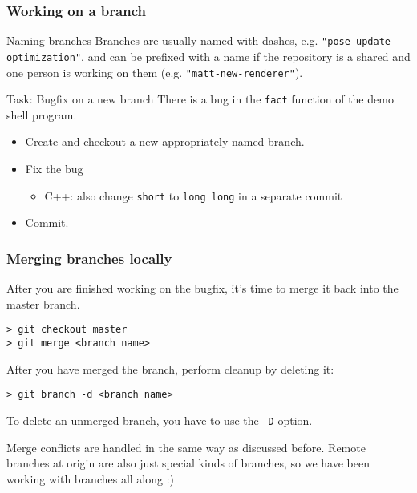 \begin{frame}[fragile]

\frametitle{Working on a branch}

\begin{block}{Naming branches}
	Branches are usually named with dashes, e.g. \texttt{"pose-update-optimization"}, and can be prefixed with a name if the repository is a shared and one person is working on them (e.g.  \texttt{"matt-new-renderer"}).
\end{block}	

\begin{block}{Task: Bugfix on a new branch}
There is a bug in the \texttt{fact} function of the demo shell program. 
	\begin{itemize}
	\item Create and checkout a new appropriately named branch.
	\item Fix the bug
	\begin{itemize}
	\item C++: also change \texttt{short} to \texttt{long long} in a separate commit
	\end{itemize}
	\item Commit.
	\end{itemize}
\end{block}	

\end{frame}


\begin{frame}[fragile]

\frametitle{Merging branches locally}

After you are finished working on the bugfix, it's time to merge it back into the master branch.
\begin{verbatim}
> git checkout master
> git merge <branch name>
\end{verbatim}

After you have merged the branch, perform cleanup by deleting it:\begin{verbatim}
> git branch -d <branch name>
\end{verbatim}

To delete an unmerged branch, you have to use the \texttt{-D} option.

\medskip
Merge conflicts are handled in the same way as discussed before. Remote branches at origin are also just special kinds of branches, so we have been working with branches all along :) 

\end{frame}


